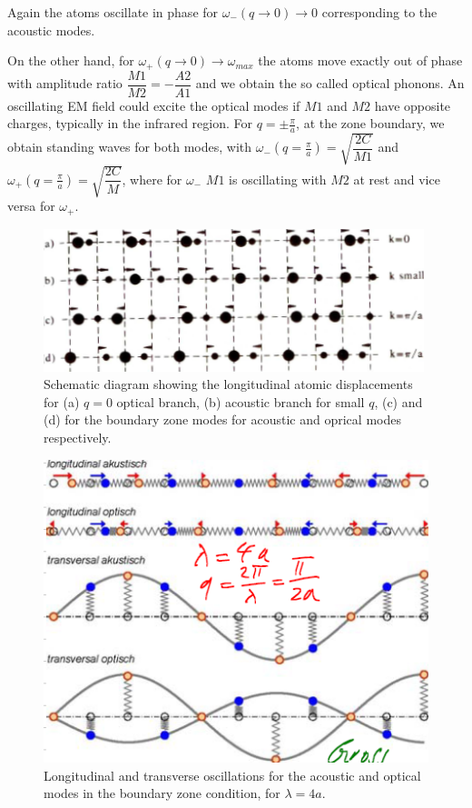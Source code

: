 \documentclass[openany,11pt,a4paper]{report}
\begin{document}
Again the atoms oscillate in phase for $ \omega _{-} (q \rightarrow0)\rightarrow 0$ corresponding to the acoustic modes.\

On the other hand, for $\omega _{+} (q \rightarrow0)\rightarrow  \omega _{max}$ the atoms move exactly out of phase with amplitude ratio $\dfrac{M1}{M2}= -\dfrac{A2}{A1}$ and we obtain the so called optical phonons. An oscillating EM field could excite the optical modes if $M1$ and $M2$ have opposite charges, typically in the infrared region. For $q= \pm \frac{\pi}{a}$, at the zone boundary, we obtain standing waves for both modes, with $\omega _{-} (q=\frac{\pi}{a}) = \sqrt{\dfrac{2C}{M1}}$ and $\omega _{+}(q=\frac{\pi}{a}) = \sqrt{\dfrac{2C}{M}}$, where for $\omega _{-} $  $ M1$ is oscillating with $M2$ at rest and vice versa for $\omega _{+}$.

\begin{figure}[H]
\centering
\includegraphics[scale=1.]{allmomentums.PNG}
\caption{
Schematic diagram showing the longitudinal atomic displacements for (a) $q=0$ optical branch, (b) acoustic branch for small $q$, (c) and (d) for the boundary zone modes for acoustic and oprical modes respectively.  \cite{phonons}}
\end{figure}





\begin{figure}[H]
\centering
\includegraphics[scale=1]{allmomencp1.PNG}
\caption{Longitudinal and transverse oscillations for the acoustic and optical modes in the boundary zone condition, for $\lambda = 4a$. \cite{CM1}}
\end{figure}
\end{document}
